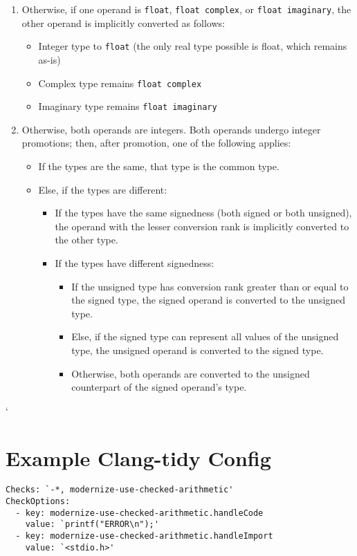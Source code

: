 \begin{enumerate}
    \item Otherwise, if one operand is \texttt{float}, \texttt{float complex}, or \texttt{float imaginary}, the other operand is implicitly converted as follows:
    \begin{itemize}
        \item Integer type to \texttt{float} (the only real type possible is float, which remains as-is)
        \item Complex type remains \texttt{float complex}
        \item Imaginary type remains \texttt{float imaginary}
    \end{itemize}

    \item Otherwise, both operands are integers. Both operands undergo integer promotions; then, after promotion, one of the following applies:
    \begin{itemize}
        \item If the types are the same, that type is the common type.
        \item Else, if the types are different:
        \begin{itemize}
            \item If the types have the same signedness (both signed or both unsigned), the operand with the lesser conversion rank is implicitly converted to the other type.
            \item If the types have different signedness:
            \begin{itemize}
                \item If the unsigned type has conversion rank greater than or equal to the signed type, the signed operand is converted to the unsigned type.
                \item Else, if the signed type can represent all values of the unsigned type, the unsigned operand is converted to the signed type.
                \item Otherwise, both operands are converted to the unsigned counterpart of the signed operand's type.
            \end{itemize}
        \end{itemize}
    \end{itemize}
\end{enumerate}`

\chapter{Example Clang-tidy Config}
\label{appendix:config}
\begin{verbatim}
Checks: `-*, modernize-use-checked-arithmetic'
CheckOptions:
  - key: modernize-use-checked-arithmetic.handleCode
    value: `printf("ERROR\n");'
  - key: modernize-use-checked-arithmetic.handleImport
    value: `<stdio.h>'
\end{verbatim}
